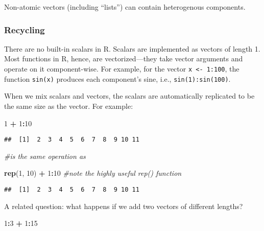 \documentclass[11pt,]{article}
\newenvironment{Shaded}{\begin{snugshade}}{\end{snugshade}}
\newcommand{\KeywordTok}[1]{\textcolor[rgb]{0.13,0.29,0.53}{\textbf{#1}}}
\newcommand{\DecValTok}[1]{\textcolor[rgb]{0.00,0.00,0.81}{#1}}
\newcommand{\StringTok}[1]{\textcolor[rgb]{0.31,0.60,0.02}{#1}}
\newcommand{\CommentTok}[1]{\textcolor[rgb]{0.56,0.35,0.01}{\textit{#1}}}
\newcommand{\OperatorTok}[1]{\textcolor[rgb]{0.81,0.36,0.00}{\textbf{#1}}}
\newcommand{\NormalTok}[1]{#1}
\begin{document}
Non-atomic vectors (including ``lists'') can contain heterogenous
components.

\subsubsection{Recycling}\label{recycling}

There are no built-in scalars in R. Scalars are implemented as vectors
of length 1. Most functions in R, hence, are vectorized---they take
vector arguments and operate on it component-wise. For example, for the
vector \texttt{x\ \textless{}-\ 1:100}, the function \texttt{sin(x)}
produces each component's sine, i.e., \texttt{sin(1):sin(100)}.

When we mix scalars and vectors, the scalars are automatically
replicated to be the same size as the vector. For example:

\begin{Shaded}
\begin{Highlighting}[]
\DecValTok{1} \OperatorTok{+}\StringTok{ }\DecValTok{1}\OperatorTok{:}\DecValTok{10}
\end{Highlighting}
\end{Shaded}

\begin{verbatim}
##  [1]  2  3  4  5  6  7  8  9 10 11
\end{verbatim}

\begin{Shaded}
\begin{Highlighting}[]
\CommentTok{#is the same operation as }

\KeywordTok{rep}\NormalTok{(}\DecValTok{1}\NormalTok{, }\DecValTok{10}\NormalTok{) }\OperatorTok{+}\StringTok{ }\DecValTok{1}\OperatorTok{:}\DecValTok{10} \CommentTok{#note the highly useful rep() function}
\end{Highlighting}
\end{Shaded}

\begin{verbatim}
##  [1]  2  3  4  5  6  7  8  9 10 11
\end{verbatim}

A related question: what happens if we add two vectors of different
lengths?

\begin{Shaded}
\begin{Highlighting}[]
\DecValTok{1}\OperatorTok{:}\DecValTok{3} \OperatorTok{+}\StringTok{ }\DecValTok{1}\OperatorTok{:}\DecValTok{15}
\end{Highlighting}
\end{Shaded}
\end{document}
